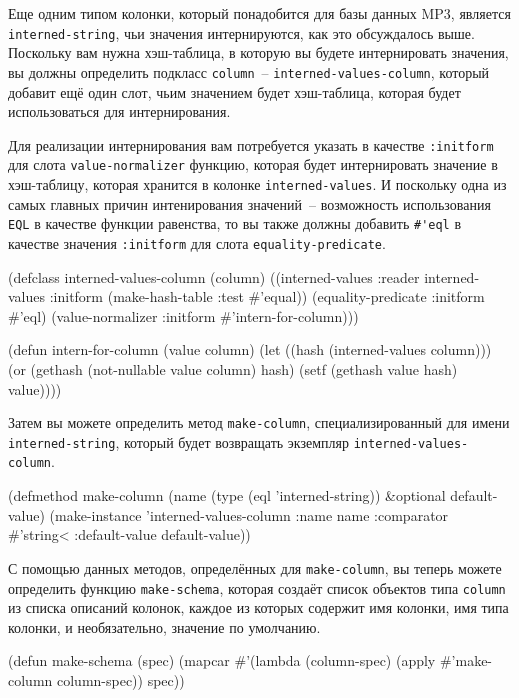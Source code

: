 Еще одним типом колонки, который понадобится для базы данных MP3, является
\lstinline{interned-string}, чьи значения интернируются, как это обсуждалось выше.  Поскольку
вам нужна хэш-таблица, в которую вы будете интернировать значения, вы должны определить
подкласс \lstinline{column}~-- \lstinline{interned-values-column}, который добавит ещё один слот,
чьим значением будет хэш-таблица, которая будет использоваться для интернирования.

Для реализации интернирования вам потребуется указать в качестве \lstinline{:initform} для
слота \lstinline{value-normalizer} функцию, которая будет интернировать значение в хэш-таблицу,
которая хранится в колонке \lstinline{interned-values}.  И поскольку одна из самых главных
причин интенирования значений~-- возможность использования \lstinline{EQL} в качестве функции
равенства, то вы также должны добавить \lstinline!#'eql! в качестве значения \lstinline{:initform}
для слота \lstinline{equality-predicate}.

\begin{myverb}
(defclass interned-values-column (column)
  ((interned-values
    :reader interned-values
    :initform (make-hash-table :test #'equal))
   (equality-predicate :initform #'eql)
   (value-normalizer   :initform #'intern-for-column)))

(defun intern-for-column (value column)
  (let ((hash (interned-values column)))
    (or (gethash (not-nullable value column) hash)
        (setf (gethash value hash) value))))
\end{myverb}

Затем вы можете определить метод \lstinline{make-column}, специализированный для имени
\lstinline{interned-string}, который будет возвращать экземпляр \lstinline{interned-values-column}.

\begin{myverb}
(defmethod make-column (name (type (eql 'interned-string)) &optional default-value)
  (make-instance 
   'interned-values-column
   :name name
   :comparator #'string< 
   :default-value default-value))
\end{myverb}

С помощью данных методов, определённых для \lstinline{make-column}, вы теперь можете определить
функцию \lstinline{make-schema}, которая создаёт список объектов типа \lstinline{column} из списка
описаний колонок, каждое из которых содержит имя колонки, имя типа колонки, и
необязательно, значение по умолчанию.

\begin{myverb}
(defun make-schema (spec)
  (mapcar #'(lambda (column-spec) (apply #'make-column column-spec)) spec))
\end{myverb}

